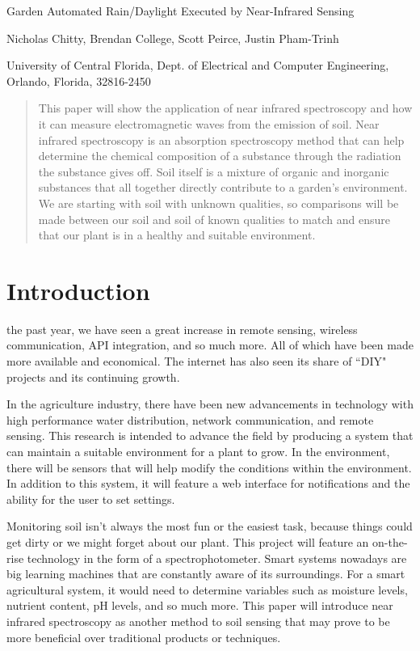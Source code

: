 \documentclass[journal]{IEEEtran}
\begin{document}
\begin{center}
	\Large Garden Automated Rain/Daylight Executed by Near-Infrared Sensing \break

	\large Nicholas Chitty, Brendan College, Scott Peirce, Justin Pham-Trinh \break

	\large University of Central Florida, Dept. of Electrical and Computer Engineering, Orlando,
	Florida, 32816-2450
\end{center}

\begin{abstract}
	This paper will show the application of near infrared spectroscopy
	and how it can measure electromagnetic waves from the emission of soil. Near infrared spectroscopy
	is an absorption spectroscopy method that can help determine the chemical composition of a
	substance through the radiation the substance gives off. Soil itself is a mixture of organic and
	inorganic substances that all together directly contribute to a garden’s environment. We are
	starting with soil with unknown qualities, so comparisons will be made between our soil and soil
	of known qualities to match and ensure that our plant is in a healthy and suitable environment.
\end{abstract}

\section{Introduction}
 the past year, we have seen a great increase in remote sensing, wireless
communication, API integration, and so much more. All of which have been made more available and
economical. The internet has also seen its share of ``DIY" projects and its continuing growth.

In the agriculture industry, there have been new advancements in technology with high performance
water distribution, network communication, and remote sensing. This research is intended to advance
the field by producing a system that can maintain a suitable environment for a plant to grow. In the
environment, there will be sensors that will help modify the conditions within the environment. In
addition to this system, it will feature a web interface for notifications and the ability for the
user to set settings.

Monitoring soil isn't always the most fun or the easiest task, because things could get dirty or we
might forget about our plant. This project will feature an on-the-rise technology in the form of a
spectrophotometer. Smart systems nowadays are big learning machines that are constantly aware of its
surroundings. For a smart agricultural system, it would need to determine variables such as moisture
levels, nutrient content, pH levels, and so much more. This paper will introduce near infrared
spectroscopy as another method to soil sensing that may prove to be more beneficial over traditional
products or techniques.
\end{document}
